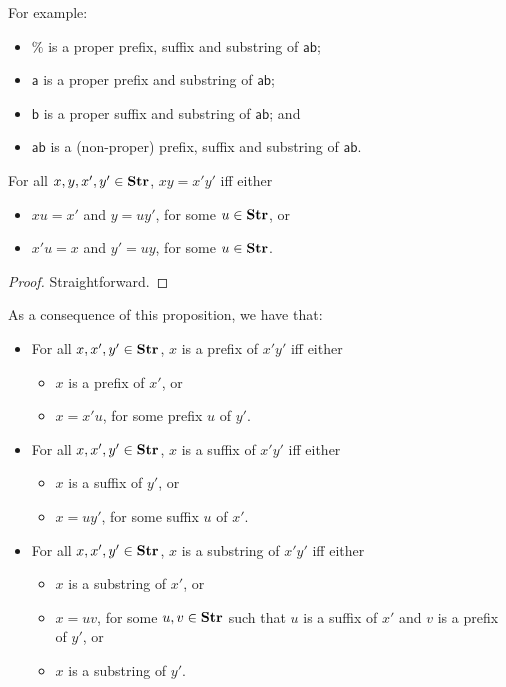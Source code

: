 For example:
\begin{itemize}
\item $\%$ is a proper prefix, suffix and substring of
$\mathsf{ab}$;

\item $\mathsf{a}$ is a proper prefix and substring of
$\mathsf{ab}$;

\item $\mathsf{b}$ is a proper suffix and substring of
$\mathsf{ab}$; and

\item $\mathsf{ab}$ is a (non-proper) prefix, suffix and
substring of $\mathsf{ab}$.
\end{itemize}

\begin{proposition}
For all $x,y,x',y'\in\mathbf{Str}$, $xy=x'y'$ iff either
\begin{itemize}
\item $xu=x'$ and $y=uy'$, for some $u\in\mathbf{Str}$, or

\item $x'u=x$ and $y'=uy$, for some $u\in\mathbf{Str}$.
\end{itemize}
\end{proposition}

\begin{proof}
Straightforward.
\end{proof}

As a consequence of this proposition, we have that:
\begin{itemize}
\item For all $x,x',y'\in\mathbf{Str}$, $x$ is a prefix of $x'y'$ iff
either
\begin{itemize}
\item $x$ is a prefix of $x'$, or

\item $x=x'u$, for some prefix $u$ of $y'$.
\end{itemize}

\item For all $x,x',y'\in\mathbf{Str}$, $x$ is a suffix of $x'y'$ iff
either
\begin{itemize}
\item $x$ is a suffix of $y'$, or

\item $x=uy'$, for some suffix $u$ of $x'$.
\end{itemize}

\item For all $x,x',y'\in\mathbf{Str}$, $x$ is a substring of $x'y'$ iff
either
\begin{itemize}
\item $x$ is a substring of $x'$, or

\item $x=uv$, for some $u,v\in\mathbf{Str}$ such that
  $u$ is a suffix of $x'$ and $v$ is a prefix of $y'$, or

\item $x$ is a substring of $y'$.
\end{itemize}
\end{itemize}

